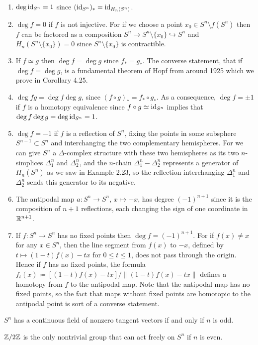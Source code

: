 \begin{enumerate}[label=(\arabic*)]
\item $\deg\operatorname{id}_{S^n}=1$ since $(\operatorname{id}_{S^n})_*=\operatorname{id}_{H_n(S^n)}$.
\item $\deg f=0$ if $f$ is not injective. For if we choose a point $x_0\in
  S^n\setminus f(S^n)$ then $f$ can be factored as a composition $S^n\to
  S^n\setminus\{x_0\}\hookrightarrow S^n$ and $H_n(S^n\setminus\{x_0\})=0$ since
  $S^n\setminus\{x_0\}$ is contractible.
\item If $f\simeq g$ then $\deg f=\deg g$ since $f_*=g_*$. The converse
  statement, that if $\deg f=\deg g$, is a fundamental theorem of Hopf from
  around 1925 which we prove in Corollary 4.25.
\item $\deg fg=\deg f\deg g$, since $(f\circ g)_*=f_*\circ g_*$. As a
  consequence, $\deg f=\pm 1$ if $f$ is a homotopy equivalence since
  $f\circ g\simeq \operatorname{id}_{S^n}$ implies that $\deg f\deg g=\deg\operatorname{id}_{S^n}=1$.
\item $\deg f=-1$ if $f$ is a reflection of $S^n$, fixing the points in
  some subsphere $S^{n-1}\subset S^n$ and interchanging the two
  complementary hemispheres. For we can give $S^n$ a $\Delta$-complex
  structure with these two hemispheres as its two $n$-simplices
  $\Delta_1^n$ and $\Delta_2^n$, and the $n$-chain $\Delta_1^n-\Delta_2^n$
  represents a generator of $H_n(S^n)$ as we saw in Example 2.23, so the
  reflection interchanging $\Delta_1^n$ and $\Delta_2^n$ sends this
  generator to its negative.
\item The antipodal map $a\colon S^n\to S^n$, $x\mapsto -x$, has degree
  $(-1)^{n+1}$ since it is the composition of $n+1$ reflections, each
  changing the sign of one coordinate in $\mathbb{R}^{n+1}$.
\item If $f\colon S^n\to S^n$ has no fixed points then $\deg
  f=(-1)^{n+1}$. For if $f(x)\neq x$ for any $x\in S^n$, then the line
  segment from $f(x)$ to $-x$, defined by $t\mapsto(1-t)f(x)-tx$ for $0\leq
  t\leq 1$, does not pass through the origin. Hence if $f$ has no fixed
  points, the formula $f_t(x)\coloneqq[(1-t)f(x)-tx]/\|(1-t)f(x)-tx\|$
  defines a homotopy from $f$ to the antipodal map. Note that the antipodal
  map has no fixed points, so the fact that maps without fixed points are
  homotopic to the antipodal point is sort of a converse statement.
\end{enumerate}
\begin{theorem}[2.8]
$S^n$ has a continuous field of nonzero tangent vectors if and only if $n$
is odd.
\end{theorem}
\begin{proposition*}[2.29]
$\mathbb{Z}/2\mathbb{Z}$ is the only nontrivial group that can act freely on $S^n$ if
$n$ is even.
\end{proposition*}

